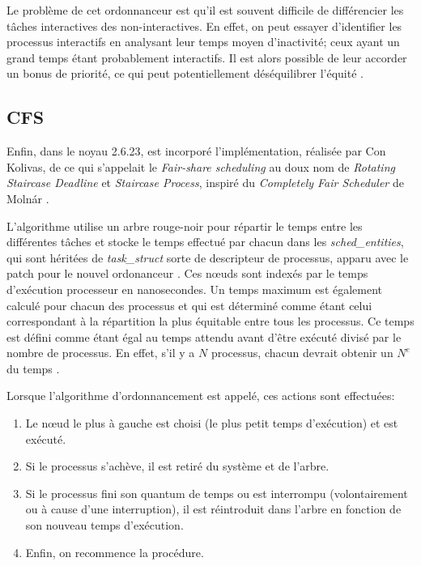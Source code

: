 \documentclass[letterpaper]{article}
\begin{document}
Le problème de cet ordonnanceur est qu'il est souvent difficile de différencier les tâches interactives des non-interactives. En effet, on peut essayer d'identifier les processus interactifs en analysant leur temps moyen d'inactivité; ceux ayant un grand temps étant probablement interactifs. Il est alors possible de leur accorder un bonus de priorité, ce qui peut potentiellement déséquilibrer l'équité \citep{4631872}.

\subsection{CFS}

Enfin, dans le noyau 2.6.23, est incorporé l'implémentation, réalisée par Con Kolivas, de ce qui s'appelait le \textit{Fair-share scheduling} au doux nom de \textit{Rotating Staircase Deadline} et \textit{Staircase Process}, inspiré du \textit{Completely Fair Scheduler} de Molnár \citep{PATCHCFS}.

L'algorithme utilise un arbre rouge-noir \citep{jones2009inside} pour répartir le temps entre les différentes tâches et stocke le temps effectué par chacun dans les \textit{sched\_entities}, qui sont héritées de \textit{task\_struct} sorte de descripteur de processus, apparu avec le patch pour le nouvel ordonanceur \citep{Pabla:2009:CFS:1594371.1594375}. Ces nœuds sont indexés par le temps d'exécution processeur en nanosecondes. Un temps maximum est également calculé pour chacun des processus et qui est déterminé comme étant celui correspondant à la répartition la plus équitable entre tous les processus. Ce temps est défini comme étant égal au temps attendu avant d'être exécuté divisé par le nombre de processus. En effet, s'il y a $N$ processus, chacun devrait obtenir un $N^{e}$ du temps \citep{IllustrationCFSusingAATree}.

Lorsque l'algorithme d'ordonnancement est appelé, ces actions sont effectuées:

\begin{enumerate}
\item Le nœud le plus à gauche est choisi (le plus petit temps d'exécution) et est exécuté.
\item Si le processus s'achève, il est retiré du système et de l'arbre.
\item Si le processus fini son quantum de temps ou est interrompu (volontairement ou à cause d'une interruption), il est réintroduit dans l'arbre en fonction de son nouveau temps d'exécution.
\item Enfin, on recommence la procédure.
\end{enumerate}
\end{document}
